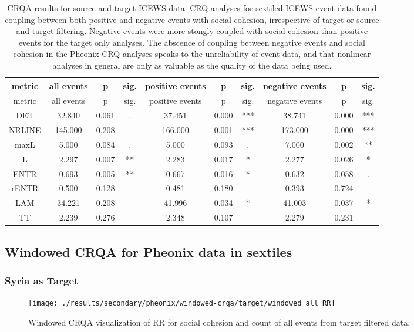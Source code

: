 \documentclass[english,man]{apa6}
\begin{document}
\begin{longtable}[]{@{}cccccccccc@{}}
\caption{CRQA results for source and target ICEWS data.
CRQ analyses for sextiled ICEWS event data found coupling between both positive and negative events with social cohesion, irrespective of target or source and target filtering. Negative events were more stongly coupled with social cohesion than positive events for the target only analyses.
The abscence of coupling between negative events and social cohesion in the Pheonix CRQ analyses speaks to the unreliability of event data, and that nonlinear analyses in general are only as valuable as the quality of the data being used.}\tabularnewline
\toprule
metric & all events & p & sig. & positive events & p & sig. & negative events & p & sig.\tabularnewline
\midrule
\endfirsthead
\toprule
metric & all events & p & sig. & positive events & p & sig. & negative events & p & sig.\tabularnewline
\midrule
\endhead
DET & 32.840 & 0.061 & . & 37.451 & 0.000 & *** & 38.741 & 0.000 & ***\tabularnewline
NRLINE & 145.000 & 0.208 & & 166.000 & 0.001 & *** & 173.000 & 0.000 & ***\tabularnewline
maxL & 5.000 & 0.084 & . & 5.000 & 0.093 & . & 7.000 & 0.002 & **\tabularnewline
L & 2.297 & 0.007 & ** & 2.283 & 0.017 & * & 2.277 & 0.026 & *\tabularnewline
ENTR & 0.693 & 0.005 & ** & 0.667 & 0.016 & * & 0.632 & 0.058 & .\tabularnewline
rENTR & 0.500 & 0.128 & & 0.481 & 0.180 & & 0.393 & 0.724 &\tabularnewline
LAM & 34.221 & 0.208 & & 41.996 & 0.034 & * & 41.003 & 0.037 & *\tabularnewline
TT & 2.239 & 0.276 & & 2.348 & 0.107 & & 2.279 & 0.231 &\tabularnewline
\bottomrule
\end{longtable}

\hypertarget{windowed-crqa-for-pheonix-data-in-sextiles}{%
\subsection{Windowed CRQA for Pheonix data in sextiles}\label{windowed-crqa-for-pheonix-data-in-sextiles}}

\hypertarget{syria-as-target-4}{%
\subsubsection{Syria as Target}\label{syria-as-target-4}}

\begin{figure}
\texttt{[image: ./results/secondary/pheonix/windowed-crqa/target/windowed\_all\_RR]} \caption{Windowed CRQA visualization of RR for social cohesion and count of all events from target filtered data.}\label{fig:plot-RR-targ-all-secondary-pheonix}
\end{figure}
\end{document}
